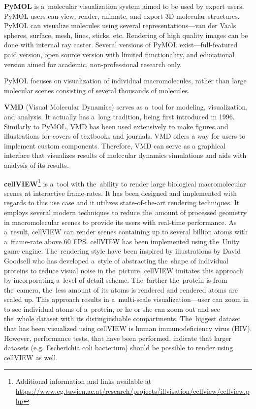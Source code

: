 \documentclass[
  digital, %
  table,   %
  nolof,     %
  nolot,     %
  oneside,
]{fithesis3}
\begin{document}

\textbf{PyMOL} \cite{PyMOL} is a molecular visualization system aimed to be used by expert users. PyMOL users can view, render, animate, and export 3D molecular structures. PyMOL can visualize molecules using several representations—van der Vaals spheres, surface, mesh, lines, sticks, etc. Rendering of high quality images can be done with internal ray caster. Several versions of PyMOL exist—full-featured paid version, open source version with limited functionality, and educational version aimed for academic, non-professional research only.

PyMOL focuses on visualization of individual macromolecules, rather than large molecular scenes consisting of several thousands of molecules.

\textbf{VMD} (Visual Molecular Dynamics) \cite{HUMP96} serves as a tool for modeling, visualization, and analysis. It actually has a long tradition, being first introduced in 1996. Similarly to PyMOL, VMD has been used extensively to make figures and illustrations for covers of textbooks and journals. VMD offers a way for users to implement custom components. Therefore, VMD can serve as a graphical interface that visualizes results of molecular dynamics simulations and aids with analysis of its results.

\textbf{cellVIEW}\footnote{Additional information and links available at \url{https://www.cg.tuwien.ac.at/research/projects/illvisation/cellview/cellview.php}} \cite{cellVIEW_2015} is a tool with the ability to render large biological macromolecular scenes at interactive frame-rates. It has been designed and implemented with regards to this use case and it utilizes state-of-the-art rendering techniques. It employs several modern techniques to reduce the amount of processed geometry in macromolecular scenes to provide its users with real-time performance. As a result, cellVIEW can render scenes containing up to several billion atoms with a frame-rate above 60 FPS. cellVIEW has been implemented using the Unity game engine. The rendering style have been inspired by illustrations by David Goodsell who has developed a style of abstracting the shape of individual proteins to reduce visual noise in the picture. cellVIEW imitates this approach by incorporating a level-of-detail scheme. The farther the protein is from the camera, the less amount of its atoms is rendered and rendered atoms are scaled up. This approach results in a multi-scale visualization—user can zoom in to see individual atoms of a protein, or he or she can zoom out and see the whole dataset with its distinguishable compartments. The biggest dataset that has been visualized using cellVIEW is human immunodeficiency virus (HIV). However, performance tests, that have been performed, indicate that larger datasets (e.g. Escherichia coli bacterium) should be possible to render using cellVIEW as well.
\end{document}
